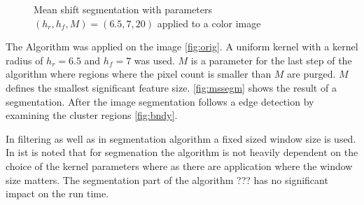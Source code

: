 \begin{figure}[ht]
\centering
{}%
%
%

\caption{Mean shift segmentation with parameters $(h_r, h_f, M) = (6.5, 7, 20)$
		 applied to a color image}
\label{fig:mssegm}
\end{figure}


The Algorithm was applied on the image \autoref{fig:orig}. A uniform kernel with
a kernel radius of $h_r = 6.5$ and $h_f = 7$ was used. $M$ is a parameter for
the last step of the algorithm where regions where the pixel count is smaller
than $M$ are purged. $M$ defines the smallest significant feature size.
\autoref{fig:mssegm} shows the result of a segmentation. After the image
segmentation follows a edge detection by examining the cluster regions
\autoref{fig:bndy}.

In filtering as well as in segmentation algorithm a fixed sized window size is 
used. In \citeauthor{citeulike:462300} \citep{citeulike:462300} ist is noted
that for segmenation the algorithm is not heavily dependent on the choice of the
kernel parameters where as there are application where the window size matters. 
The segmentation part of the algorithm ??? has no significant impact on the 
run time. 



